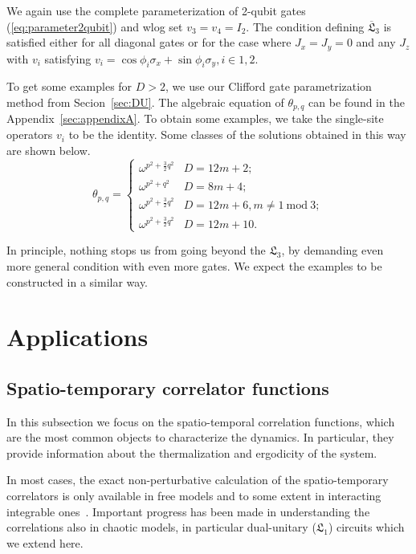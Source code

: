 \documentclass[aps,prx,twocolumn,notitlepage,nofootinbib,nobalancelastpage]{revtex4-2}
\theoremstyle{break}
\newcommand{\1}{\mathbbm{1}}
\theoremstyle{plain}
\theoremstyle{plain}
\theoremstyle{plain}
\begin{document}
We again use the complete parameterization of 2-qubit gates (\ref{eq:parameter2qubit}) and wlog set $v_3=v_4=I_2$. The condition defining $\overline{\mathfrak{L}}_3$ is satisfied either for all diagonal gates or for the case where $J_{x}=J_{y}=0$ and any $J_z$ with $v_i$ satisfying $v_i=\cos{\phi_i}\sigma_x+\sin{\phi_i}\sigma_y,i\in{1,2}$. %

To get some examples for $D>2$, we use our Clifford gate parametrization method
from Secion~\ref{sec:DU}. 
The algebraic equation
of $\theta_{p,q}$ can be found in the Appendix~\ref{sec:appendixA}. To obtain some examples, we take the single-site operators $v_i$ to be the identity. Some classes of the solutions obtained in this way are shown below.
\begin{equation}
\theta_{p,q}=\begin{cases}
\omega^{p^{2}+\frac{3}{2}q^{2}} & D=12m+2;\\
\omega^{p^{2}+q^{2}} & D=8m+4;\\
\omega^{p^{2}+\frac{3}{2}q^{2}} & D=12m+6,m\neq1\ \mathrm{mod}\ 3;\\
\omega^{p^{2}+\frac{3}{2}q^{2}} & D=12m+10.
\end{cases}
\end{equation}

In principle, nothing stops us from going beyond the $\mathfrak{L}_3$, by demanding even more general condition with even more gates. We expect the examples to be constructed in a similar way.
\section{Applications}
\label{sec:applications}
\subsection{Spatio-temporary correlator functions}\label{subsec:STCF}
In this subsection we focus on the spatio-temporal correlation functions, which are the most common objects to characterize the dynamics. In particular, they provide information about the thermalization and ergodicity of the system. %

In most cases, the exact non-perturbative calculation of the spatio-temporary correlators is only available in free models and to some extent in interacting integrable ones~\cite{Medenjak_2017,Klobas_2019,Klobas_2021}. 
Important progress has been made in understanding the correlations also in chaotic models, in particular dual-unitary ($\mathfrak{L}_1$) circuits which we extend here.
\end{document}
